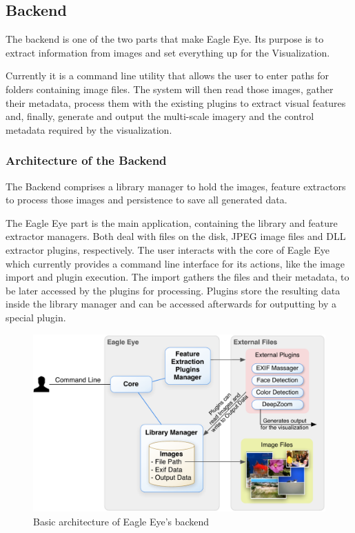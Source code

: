 \subsection{Backend} %
\label{sub:backend}

The backend is one of the two parts that make Eagle Eye. Its purpose is to extract information from images and set everything up for the Visualization.

Currently it is a command line utility that allows the user to enter paths for folders containing image files. The system will then read those images, gather their metadata, process them with the existing plugins to extract visual features and, finally, generate and output the multi-scale imagery and the control metadata required by the visualization.

\subsubsection{Architecture of the Backend}

The Backend comprises a library manager to hold the images, feature extractors to process those images and persistence to save all generated data.

The Eagle Eye part is the main application, containing the library and feature extractor managers. Both deal with files on the disk, JPEG image files and DLL extractor plugins, respectively. The user interacts with the core of Eagle Eye which currently provides a command line interface for its actions, like the image import and plugin execution. The import gathers the files and their metadata, to be later accessed by the plugins for processing. Plugins store the resulting data inside the library manager and can be accessed afterwards for outputting by a special plugin.

\begin{figure}[ht]
	\centering
		\includegraphics[width=0.8\linewidth]{../Figures/Architecture_v2.pdf}
	\caption{Basic architecture of Eagle Eye's backend}
	\label{fig:arch}
\end{figure}

